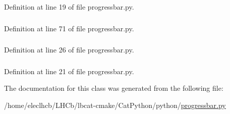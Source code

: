 Definition at line 19 of file progressbar.py.\hypertarget{classprogressbar_1_1AnimatedProgressBar_aa8ec5cac3f292b0b44d19338467793ae}{
\subsubsection[{stdout}]{}}
\label{classprogressbar_1_1AnimatedProgressBar_aa8ec5cac3f292b0b44d19338467793ae}


Definition at line 71 of file progressbar.py.\hypertarget{classprogressbar_1_1ProgressBar_a96358aecb3816a174bae4795122f5c1b}{
\subsubsection[{step}]{}}
\label{classprogressbar_1_1ProgressBar_a96358aecb3816a174bae4795122f5c1b}


Definition at line 26 of file progressbar.py.\hypertarget{classprogressbar_1_1ProgressBar_a818a39d7acf131db44f1ce01c3a1ea98}{
\subsubsection[{width}]{}}
\label{classprogressbar_1_1ProgressBar_a818a39d7acf131db44f1ce01c3a1ea98}


Definition at line 21 of file progressbar.py.

The documentation for this class was generated from the following file:\begin{DoxyCompactItemize}
\item 
/home/eleclhcb/LHCb/lbcat-\/cmake/CatPython/python/\hyperlink{progressbar_8py}{progressbar.py}\end{DoxyCompactItemize}
